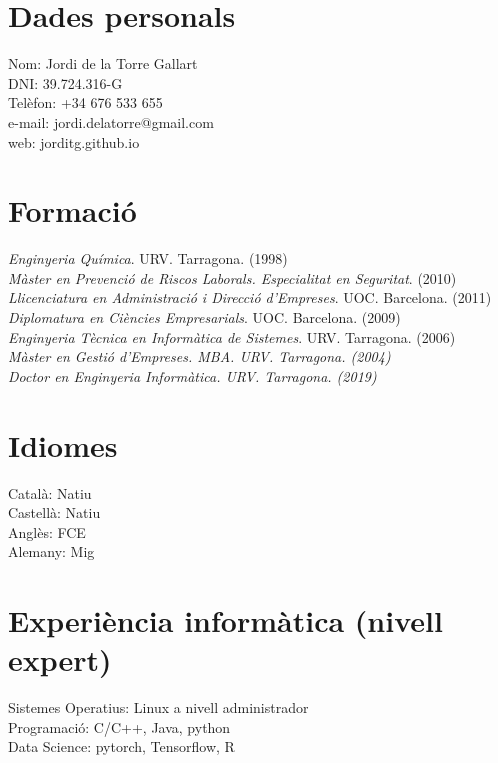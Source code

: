 \documentclass{article}
\begin{document}
\section*{Dades personals}
Nom: \hfill Jordi de la Torre Gallart\\
DNI: \hfill 39.724.316-G\\
Telèfon: \hfill +34 676 533 655\\
e-mail: \hfill jordi.delatorre@gmail.com\\
web: \hfill jorditg.github.io\\

\section*{Formació} 

{\sl Enginyeria Química}. URV. Tarragona. \hfill (1998)\\
{\sl Màster en Prevenció de Riscos Laborals. Especialitat en Seguritat}. \hfill (2010)\\
{\sl Llicenciatura en Administració i Direcció d'Empreses}. UOC. Barcelona. \hfill (2011)\\
{\sl Diplomatura en Ciències Empresarials}. UOC. Barcelona. \hfill (2009)\\ 					 					
{\sl Enginyeria Tècnica en Informàtica de Sistemes}. URV. Tarragona. \hfill (2006)\\
{\sl Màster en Gestió d'Empreses. MBA. URV. Tarragona. \hfill (2004)\\ }	
{\sl Doctor en Enginyeria Informàtica. URV. Tarragona. \hfill (2019)\\ }	

\section*{Idiomes}
Català: Natiu \\
Castellà: Natiu\\
Anglès:  FCE \\
Alemany: Mig \\

\section*{Experiència informàtica (nivell expert)}
Sistemes Operatius: \hfill Linux a nivell administrador\\
Programació: \hfill C/C++, Java, python\\
Data Science: \hfill pytorch, Tensorflow, R\\
\end{document}
